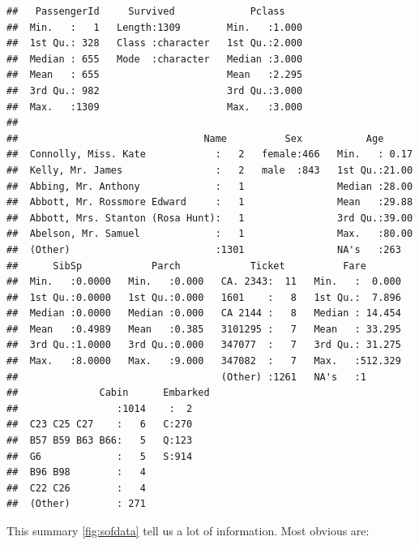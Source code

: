\documentclass[
]{book}
\begin{document}
\begin{verbatim}
##   PassengerId     Survived             Pclass     
##  Min.   :   1   Length:1309        Min.   :1.000  
##  1st Qu.: 328   Class :character   1st Qu.:2.000  
##  Median : 655   Mode  :character   Median :3.000  
##  Mean   : 655                      Mean   :2.295  
##  3rd Qu.: 982                      3rd Qu.:3.000  
##  Max.   :1309                      Max.   :3.000  
##                                                   
##                                Name          Sex           Age       
##  Connolly, Miss. Kate            :   2   female:466   Min.   : 0.17  
##  Kelly, Mr. James                :   2   male  :843   1st Qu.:21.00  
##  Abbing, Mr. Anthony             :   1                Median :28.00  
##  Abbott, Mr. Rossmore Edward     :   1                Mean   :29.88  
##  Abbott, Mrs. Stanton (Rosa Hunt):   1                3rd Qu.:39.00  
##  Abelson, Mr. Samuel             :   1                Max.   :80.00  
##  (Other)                         :1301                NA's   :263    
##      SibSp            Parch            Ticket          Fare        
##  Min.   :0.0000   Min.   :0.000   CA. 2343:  11   Min.   :  0.000  
##  1st Qu.:0.0000   1st Qu.:0.000   1601    :   8   1st Qu.:  7.896  
##  Median :0.0000   Median :0.000   CA 2144 :   8   Median : 14.454  
##  Mean   :0.4989   Mean   :0.385   3101295 :   7   Mean   : 33.295  
##  3rd Qu.:1.0000   3rd Qu.:0.000   347077  :   7   3rd Qu.: 31.275  
##  Max.   :8.0000   Max.   :9.000   347082  :   7   Max.   :512.329  
##                                   (Other) :1261   NA's   :1        
##              Cabin      Embarked
##                 :1014    :  2   
##  C23 C25 C27    :   6   C:270   
##  B57 B59 B63 B66:   5   Q:123   
##  G6             :   5   S:914   
##  B96 B98        :   4           
##  C22 C26        :   4           
##  (Other)        : 271
\end{verbatim}

This summary \ref{fig:sofdata} tell us a lot of information. Most obvious are:
\end{document}
